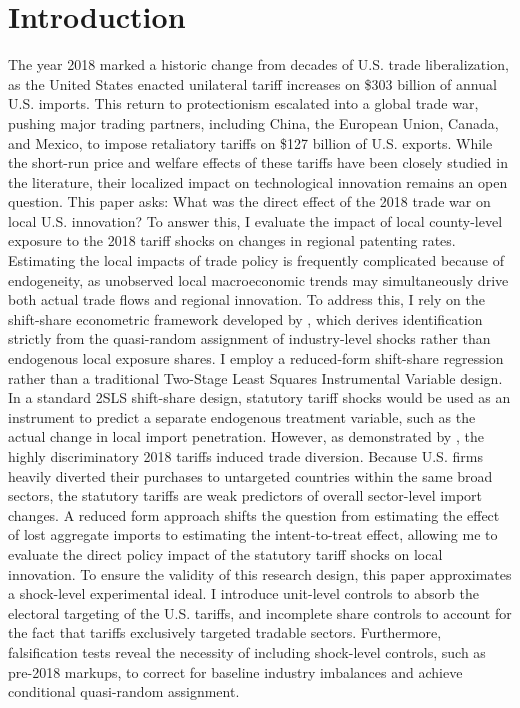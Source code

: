 \section{Introduction} 
The year 2018 marked a historic change from decades of U.S. trade liberalization, as the United States enacted unilateral tariff increases on \$303 billion of annual U.S. imports. This return to protectionism escalated into a global trade war, pushing major trading partners, including China, the European Union, Canada, and Mexico, to impose retaliatory tariffs on \$127 billion of U.S. exports.  While the short-run price and welfare effects of these tariffs have been closely studied in the literature, their localized impact on technological innovation remains an open question. This paper asks: What was the direct effect of the 2018 trade war on local U.S. innovation? To answer this, I evaluate the impact of local county-level exposure to the 2018 tariff shocks on changes in regional patenting rates. \newline
Estimating the local impacts of trade policy is frequently complicated because of endogeneity, as unobserved local macroeconomic trends may simultaneously drive both actual trade flows and regional innovation. To address this, I rely on the shift-share econometric framework developed by \cite{BHJ2022} , which derives identification strictly from the quasi-random assignment of industry-level shocks rather than endogenous local exposure shares. \newline 
I employ a reduced-form shift-share regression rather than a traditional Two-Stage Least Squares Instrumental Variable design. In a standard 2SLS shift-share design, statutory tariff shocks would be used as an instrument to predict a separate endogenous treatment variable, such as the actual change in local import penetration. However, as demonstrated by \cite{Fajgelbaum2020}, the highly discriminatory 2018 tariffs induced trade diversion. Because U.S. firms heavily diverted their purchases to untargeted countries within the same broad sectors, the statutory tariffs are weak predictors of overall sector-level import changes. A reduced form approach shifts the question from estimating the effect of lost aggregate imports to estimating the intent-to-treat effect, allowing me to evaluate the direct policy impact of the statutory tariff shocks on local innovation. \newline
To ensure the validity of this research design, this paper approximates a shock-level experimental ideal. I introduce unit-level controls to absorb the electoral targeting of the U.S. tariffs, and incomplete share controls to account for the fact that tariffs exclusively targeted tradable sectors. Furthermore, falsification tests reveal the necessity of including shock-level controls, such as pre-2018 markups, to correct for baseline industry imbalances and achieve conditional quasi-random assignment. \newline
